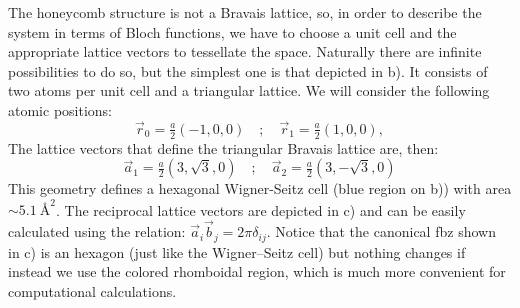 The honeycomb structure is not a Bravais lattice, so, in order to describe the system in terms of Bloch functions, we have to choose a unit cell and the appropriate lattice vectors to tessellate the space.
Naturally there are infinite possibilities to do so, but the simplest one is that depicted in b).
It consists of two atoms per unit cell and a triangular lattice. We will consider the following atomic positions:
\begin{equation}
\vec{r}_0 = \tfrac{a}{2}(-1,0,0) \quad;\quad
\vec{r}_1 = \tfrac{a}{2}(1,0,0),
\label{at_pos}
\end{equation}
The lattice vectors that define the triangular Bravais lattice are, then:
\begin{equation}
\vec{a}_1 = \tfrac{a}{2}\left(3,\sqrt{3},0\right) \quad;\quad
\vec{a}_2 = \tfrac{a}{2}\left(3,-\sqrt{3},0\right)
\label{latt_vec}
\end{equation}
This geometry defines a hexagonal Wigner-Seitz cell (blue region on b)) with area $\sim\SI{5.1}{\angstrom\squared}$. The reciprocal lattice vectors are depicted in c) and can be easily calculated using the relation\cite{Ashcroft1976}: $\vec{a}_i\vec{b}_j=2\pi\delta_{ij}$. Notice that the canonical \ac{fbz} shown in c) is an hexagon (just like the Wigner–Seitz cell) but nothing changes if instead we use the colored rhomboidal region, which is much more convenient for computational calculations.
\medbreak


